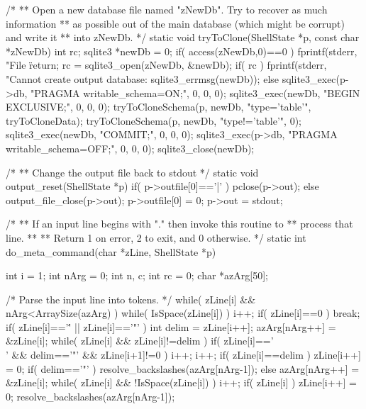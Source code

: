 \begin{Codex}[label=shell.c,numbers=left]
/*
** Open a new database file named "zNewDb".  Try to recover as much information
** as possible out of the main database (which might be corrupt) and write it
** into zNewDb.
*/
static void tryToClone(ShellState *p, const char *zNewDb){
  int rc;
  sqlite3 *newDb = 0;
  if( access(zNewDb,0)==0 ){
    fprintf(stderr, "File \"%
    return;
  }
  rc = sqlite3_open(zNewDb, &newDb);
  if( rc ){
    fprintf(stderr, "Cannot create output database: %
            sqlite3_errmsg(newDb));
  }else{
    sqlite3_exec(p->db, "PRAGMA writable_schema=ON;", 0, 0, 0);
    sqlite3_exec(newDb, "BEGIN EXCLUSIVE;", 0, 0, 0);
    tryToCloneSchema(p, newDb, "type='table'", tryToCloneData);
    tryToCloneSchema(p, newDb, "type!='table'", 0);
    sqlite3_exec(newDb, "COMMIT;", 0, 0, 0);
    sqlite3_exec(p->db, "PRAGMA writable_schema=OFF;", 0, 0, 0);
  }
  sqlite3_close(newDb);
}

/*
** Change the output file back to stdout
*/
static void output_reset(ShellState *p){
  if( p->outfile[0]=='|' ){
    pclose(p->out);
  }else{
    output_file_close(p->out);
  }
  p->outfile[0] = 0;
  p->out = stdout;
}

/*
** If an input line begins with "." then invoke this routine to
** process that line.
**
** Return 1 on error, 2 to exit, and 0 otherwise.
*/
static int do_meta_command(char *zLine, ShellState *p){
  int i = 1;
  int nArg = 0;
  int n, c;
  int rc = 0;
  char *azArg[50];

  /* Parse the input line into tokens.
  */
  while( zLine[i] && nArg<ArraySize(azArg) ){
    while( IsSpace(zLine[i]) ){ i++; }
    if( zLine[i]==0 ) break;
    if( zLine[i]=='\'' || zLine[i]=='"' ){
      int delim = zLine[i++];
      azArg[nArg++] = &zLine[i];
      while( zLine[i] && zLine[i]!=delim ){ 
        if( zLine[i]=='\\' && delim=='"' && zLine[i+1]!=0 ) i++;
        i++; 
      }
      if( zLine[i]==delim ){
        zLine[i++] = 0;
      }
      if( delim=='"' ) resolve_backslashes(azArg[nArg-1]);
    }else{
      azArg[nArg++] = &zLine[i];
      while( zLine[i] && !IsSpace(zLine[i]) ){ i++; }
      if( zLine[i] ) zLine[i++] = 0;
      resolve_backslashes(azArg[nArg-1]);
    }
  }

}
\end{Codex}
